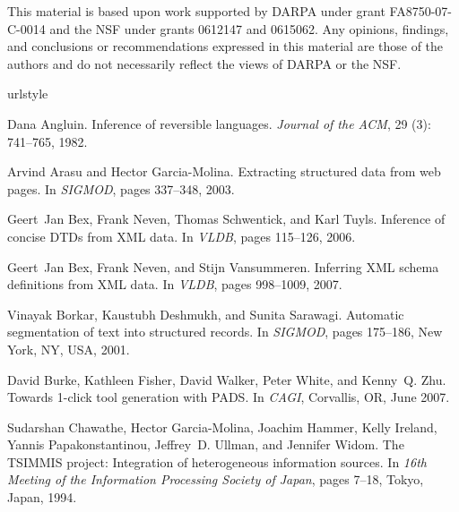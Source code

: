 \documentclass[natbib]{sigplanconf}
\begin{document}
This material is based upon work 
supported by DARPA under grant FA8750-07-C-0014
and the NSF
   under grants 0612147 and 0615062.
Any opinions, findings, and conclusions or recommendations
   expressed in this material are those of the authors and do not
   necessarily reflect the views of DARPA or the NSF.



\begin{thebibliography}{37}
\providecommand{\natexlab}[1]{#1}
\providecommand{\url}[1]{\texttt{#1}}
\expandafter\ifx\csname urlstyle\endcsname\relax
  \providecommand{\doi}[1]{doi: #1}\else
  \providecommand{\doi}{doi: \begingroup \urlstyle{rm}\Url}\fi

Dana Angluin.
\newblock Inference of reversible languages.
\newblock \emph{Journal of the ACM}, 29 (3): 741--765, 1982.

Arvind Arasu and Hector Garcia-Molina.
\newblock Extracting structured data from web pages.
\newblock In \emph{{SIGMOD}}, pages 337--348, 2003.

Geert~Jan Bex, Frank Neven, Thomas Schwentick, and Karl Tuyls.
\newblock Inference of concise {DTDs} from {XML} data.
\newblock In \emph{{VLDB}}, pages 115--126, 2006.

Geert~Jan Bex, Frank Neven, and Stijn Vansummeren.
\newblock Inferring {XML} schema definitions from {XML} data.
\newblock In \emph{{VLDB}}, pages 998--1009, 2007.

Vinayak Borkar, Kaustubh Deshmukh, and Sunita Sarawagi.
\newblock Automatic segmentation of text into structured records.
\newblock In \emph{{SIGMOD}}, pages 175--186, New York, NY, USA, 2001.

David Burke, Kathleen Fisher, David Walker, Peter White, and Kenny~Q. Zhu.
\newblock Towards 1-click tool generation with {PADS}.
\newblock In \emph{{CAGI}}, Corvallis, OR, June 2007.

Sudarshan Chawathe, Hector Garcia-Molina, Joachim Hammer, Kelly Ireland, Yannis
  Papakonstantinou, Jeffrey~D. Ullman, and Jennifer Widom.
\newblock The {TSIMMIS} project: Integration of heterogeneous information
  sources.
\newblock In \emph{16th Meeting of the Information Processing Society of
  Japan}, pages 7--18, Tokyo, Japan, 1994.


\end{thebibliography}
\end{document}
